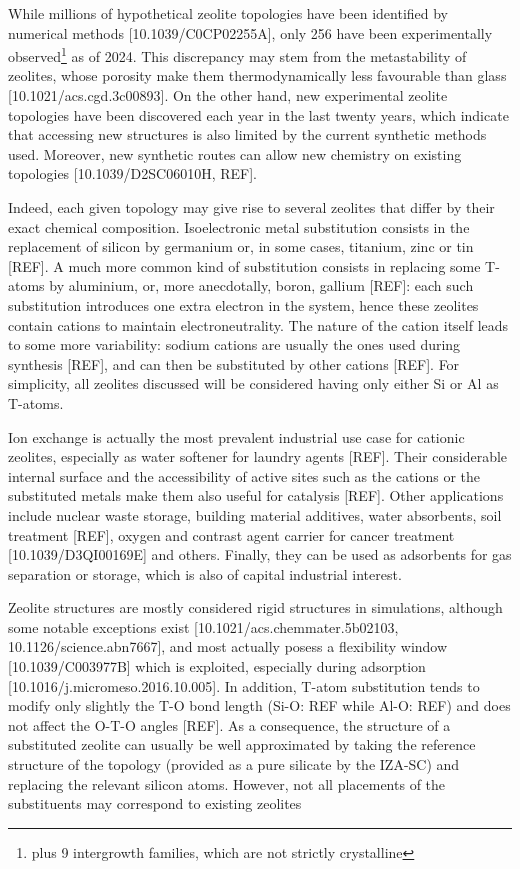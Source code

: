 \documentclass[main.tex]{subfiles}
\begin{document}
While millions of hypothetical zeolite topologies have been identified by numerical methods [10.1039/C0CP02255A], only 256 have been experimentally observed\footnote{plus 9 intergrowth families, which are not strictly crystalline} as of 2024. This discrepancy may stem from the metastability of zeolites, whose porosity make them thermodynamically less favourable than glass [10.1021/acs.cgd.3c00893]. On the other hand, new experimental zeolite topologies have been discovered each year in the last twenty years, which indicate that accessing new structures is also limited by the current synthetic methods used. Moreover, new synthetic routes can allow new chemistry on existing topologies [10.1039/D2SC06010H, REF].

Indeed, each given topology may give rise to several zeolites that differ by their exact chemical composition. Isoelectronic metal substitution consists in the replacement of silicon by germanium or, in some cases, titanium, zinc or tin [REF]. A much more common kind of substitution consists in replacing some T-atoms by aluminium, or, more anecdotally, boron, gallium [REF]: each such substitution introduces one extra electron in the system, hence these zeolites contain cations to maintain electroneutrality. The nature of the cation itself leads to some more variability: sodium cations are usually the ones used during synthesis [REF], and can then be substituted by other cations [REF]. For simplicity, all zeolites discussed will be considered having only either Si or Al as T-atoms.

Ion exchange is actually the most prevalent industrial use case for cationic zeolites, especially as water softener for laundry agents [REF]. Their considerable internal surface and the accessibility of active sites such as the cations or the substituted metals make them also useful for catalysis [REF]. Other applications include nuclear waste storage, building material additives, water absorbents, soil treatment [REF], oxygen and contrast agent carrier for cancer treatment [10.1039/D3QI00169E] and others. Finally, they can be used as adsorbents for gas separation or storage, which is also of capital industrial interest.

Zeolite structures are mostly considered rigid structures in simulations, although some notable exceptions exist [10.1021/acs.chemmater.5b02103, 10.1126/science.abn7667], and most actually posess a flexibility window [10.1039/C003977B] which is exploited, especially during adsorption [10.1016/j.micromeso.2016.10.005]. In addition, T-atom substitution tends to modify only slightly the T-O bond length (Si-O: REF while Al-O: REF) and does not affect the O-T-O angles [REF]. As a consequence, the structure of a substituted zeolite can usually be well approximated by taking the reference structure of the topology (provided as a pure silicate by the IZA-SC) and replacing the relevant silicon atoms. However, not all placements of the substituents may correspond to existing zeolites
\end{document}
